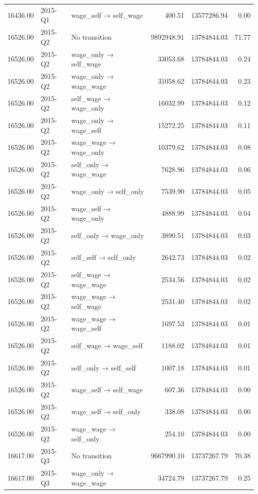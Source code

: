 \begin{table}[ht]
{\begin{tabular}{rllrrr}
  16436.00 & 2015-Q1 & wage\_self → self\_wage & 400.51 & 13577286.94 & 0.00 \\ 
  16526.00 & 2015-Q2 & No transition & 9892948.91 & 13784844.03 & 71.77 \\ 
  16526.00 & 2015-Q2 & wage\_only → self\_wage & 33053.68 & 13784844.03 & 0.24 \\ 
  16526.00 & 2015-Q2 & wage\_only → wage\_wage & 31058.62 & 13784844.03 & 0.23 \\ 
  16526.00 & 2015-Q2 & self\_wage → wage\_only & 16032.99 & 13784844.03 & 0.12 \\ 
  16526.00 & 2015-Q2 & wage\_only → wage\_self & 15272.25 & 13784844.03 & 0.11 \\ 
  16526.00 & 2015-Q2 & wage\_wage → wage\_only & 10379.62 & 13784844.03 & 0.08 \\ 
  16526.00 & 2015-Q2 & self\_only → wage\_wage & 7628.96 & 13784844.03 & 0.06 \\ 
  16526.00 & 2015-Q2 & wage\_only → self\_only & 7539.90 & 13784844.03 & 0.05 \\ 
  16526.00 & 2015-Q2 & wage\_self → wage\_only & 4888.99 & 13784844.03 & 0.04 \\ 
  16526.00 & 2015-Q2 & self\_only → wage\_only & 3890.51 & 13784844.03 & 0.03 \\ 
  16526.00 & 2015-Q2 & self\_self → self\_only & 2642.73 & 13784844.03 & 0.02 \\ 
  16526.00 & 2015-Q2 & self\_wage → wage\_wage & 2534.56 & 13784844.03 & 0.02 \\ 
  16526.00 & 2015-Q2 & wage\_wage → self\_wage & 2531.40 & 13784844.03 & 0.02 \\ 
  16526.00 & 2015-Q2 & wage\_wage → wage\_self & 1697.53 & 13784844.03 & 0.01 \\ 
  16526.00 & 2015-Q2 & self\_wage → wage\_self & 1188.02 & 13784844.03 & 0.01 \\ 
  16526.00 & 2015-Q2 & self\_only → self\_self & 1007.18 & 13784844.03 & 0.01 \\ 
  16526.00 & 2015-Q2 & wage\_self → self\_wage & 607.36 & 13784844.03 & 0.00 \\ 
  16526.00 & 2015-Q2 & wage\_self → self\_only & 338.08 & 13784844.03 & 0.00 \\ 
  16526.00 & 2015-Q2 & wage\_wage → self\_only & 254.10 & 13784844.03 & 0.00 \\ 
  16617.00 & 2015-Q3 & No transition & 9667990.10 & 13737267.79 & 70.38 \\ 
  16617.00 & 2015-Q3 & wage\_only → wage\_wage & 34724.79 & 13737267.79 & 0.25 \\ 

\end{tabular}}
\end{table}
